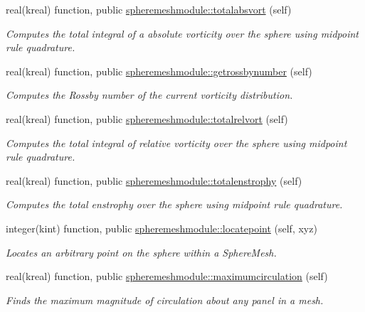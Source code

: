 \begin{DoxyCompactItemize}
real(kreal) function, public \hyperlink{group__SphereMesh_ga73b1f415fd585597ed3d213632cbf8d9}{spheremeshmodule\+::totalabsvort} (self)
\begin{DoxyCompactList}\small\item\em Computes the total integral of a absolute vorticity over the sphere using midpoint rule quadrature. \end{DoxyCompactList}\item 
real(kreal) function, public \hyperlink{group__SphereMesh_ga328b7708b010b001ba36e802abb3c863}{spheremeshmodule\+::getrossbynumber} (self)
\begin{DoxyCompactList}\small\item\em Computes the Rossby number of the current vorticity distribution. \end{DoxyCompactList}\item 
real(kreal) function, public \hyperlink{group__SphereMesh_gabe01464cd105cc5c2f2d2c577bb3eea2}{spheremeshmodule\+::totalrelvort} (self)
\begin{DoxyCompactList}\small\item\em Computes the total integral of relative vorticity over the sphere using midpoint rule quadrature. \end{DoxyCompactList}\item 
real(kreal) function, public \hyperlink{group__SphereMesh_ga3bbd7e4f63fe3cffaff0220681c612d4}{spheremeshmodule\+::totalenstrophy} (self)
\begin{DoxyCompactList}\small\item\em Computes the total enstrophy over the sphere using midpoint rule quadrature. \end{DoxyCompactList}\item 
integer(kint) function, public \hyperlink{group__SphereMesh_ga7d024751a0858a280b313d29f360c973}{spheremeshmodule\+::locatepoint} (self, xyz)
\begin{DoxyCompactList}\small\item\em Locates an arbitrary point on the sphere within a Sphere\+Mesh. \end{DoxyCompactList}\item 
real(kreal) function, public \hyperlink{group__SphereMesh_ga6686ad6af0289f6a4fb2fc33c8aaaec0}{spheremeshmodule\+::maximumcirculation} (self)
\begin{DoxyCompactList}\small\item\em Finds the maximum magnitude of circulation about any panel in a mesh. \end{DoxyCompactList}\item 

\end{DoxyCompactItemize}
